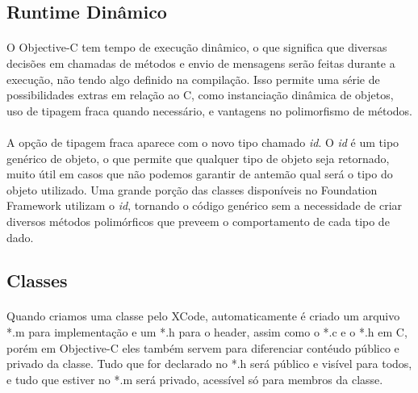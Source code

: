 \documentclass[a4paper,12pt,brazil,doubleside]{book}
\begin{document}
\bigskip 
\bigskip

\subsection{Runtime Dinâmico}

\paragraph{}O Objective-C tem tempo de execução dinâmico, o que significa que diversas decisões em chamadas de métodos e envio de mensagens serão feitas durante a execução, não tendo algo definido na compilação. Isso permite uma série de possibilidades extras em relação ao C, como instanciação dinâmica de objetos, uso de tipagem fraca quando necessário, e vantagens no polimorfismo de métodos.
\paragraph{}A opção de tipagem fraca aparece com o novo tipo chamado \textit{id}. O \textit{id} é um tipo genérico de objeto, o que permite que qualquer tipo de objeto seja retornado, muito útil em casos que não podemos garantir de antemão qual será o tipo do objeto utilizado. Uma grande porção das classes disponíveis no Foundation Framework utilizam o \textit{id}, tornando o código genérico sem a necessidade de criar diversos métodos polimórficos que preveem o comportamento de cada tipo de dado.

\bigskip 

\subsection{Classes}

\paragraph{}Quando criamos uma classe pelo XCode, automaticamente é criado um arquivo *.m para implementação e um *.h para o header, assim como o *.c e o *.h em C, porém em Objective-C eles também servem para diferenciar contéudo público e privado da classe. Tudo que for declarado no *.h será público e visível para todos, e tudo que estiver no *.m será privado, acessível só para membros da classe.

\bigskip
\end{document}
